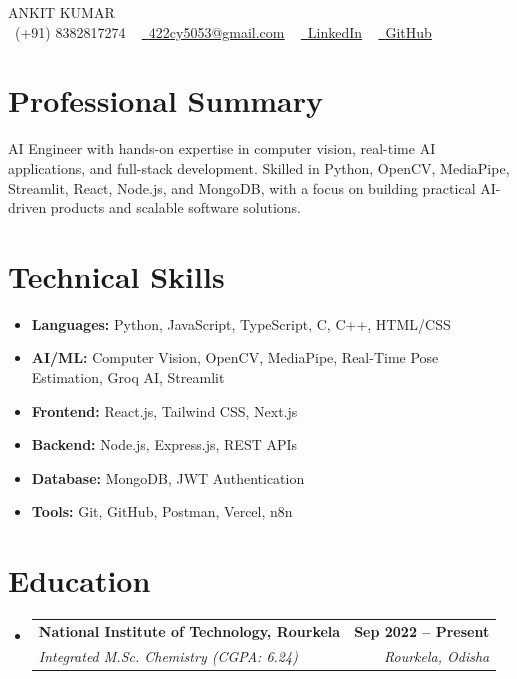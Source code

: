 \documentclass[letterpaper,10pt]{article}
\makeatletter
\newcommand{\resumeSubheading}[4]{
  \vspace{-2pt}\item
    \begin{tabular*}{1.0\textwidth}[t]{l@{\extracolsep{\fill}}r}
      \textbf{#1} & \textbf{\small #2} \\
      \textit{\small#3} & \textit{\small #4} \\
    \end{tabular*}\vspace{-7pt}
}
\newcommand{\resumeSubHeadingListStart}{\begin{itemize}[leftmargin=0.0in, label={}]}
\newcommand{\resumeSubHeadingListEnd}{\end{itemize}}
\makeatother
\begin{document}
\begin{center}
    {\Huge \scshape ANKIT KUMAR} \\ \vspace{3pt}
    \small \raisebox{-0.1\height}\faPhone\ (+91) 8382817274 ~ \href{mailto:422cy5053@gmail.com}{\raisebox{-0.2\height}\faEnvelope\ \underline{422cy5053@gmail.com}} ~ 
    \href{https://linkedin.com/in/ankit-kumar-970839367}{\raisebox{-0.2\height}\faLinkedin\ \underline{LinkedIn}}  ~
    \href{https://github.com/Ankitkumar3002}{\raisebox{-0.2\height}\faGithub\ \underline{GitHub}}
    \vspace{-8pt}
\end{center}

\section{Professional Summary}
\small AI Engineer with hands-on expertise in computer vision, real-time AI applications, and full-stack development. Skilled in Python, OpenCV, MediaPipe, Streamlit, React, Node.js, and MongoDB, with a focus on building practical AI-driven products and scalable software solutions.

\section{Technical Skills}
\begin{itemize}[leftmargin=0.15in, itemsep=1pt]
\item \textbf{Languages:} Python, JavaScript, TypeScript, C, C++, HTML/CSS
\item \textbf{AI/ML:} Computer Vision, OpenCV, MediaPipe, Real-Time Pose Estimation, Groq AI, Streamlit
\item \textbf{Frontend:} React.js, Tailwind CSS, Next.js
\item \textbf{Backend:} Node.js, Express.js, REST APIs
\item \textbf{Database:} MongoDB, JWT Authentication
\item \textbf{Tools:} Git, GitHub, Postman, Vercel, n8n
\end{itemize}

\section{Education}
\resumeSubHeadingListStart
\resumeSubheading
{National Institute of Technology, Rourkela}
{Sep 2022 -- Present}
{Integrated M.Sc. Chemistry (CGPA: 6.24)}
{Rourkela, Odisha}
\resumeSubHeadingListEnd
\end{document}
